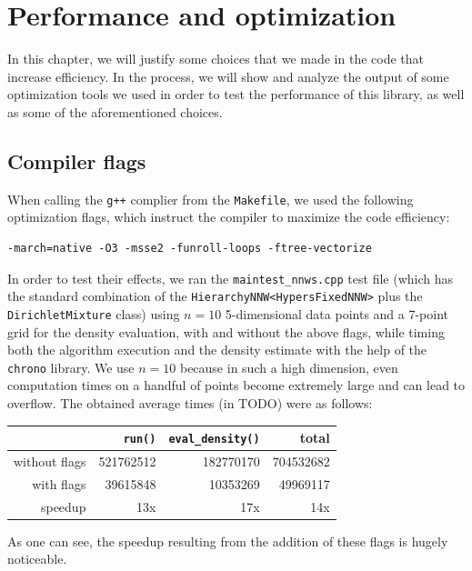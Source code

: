 \chapter{Performance and optimization}
In this chapter, we will justify some choices that we made in the code that increase efficiency.
In the process, we will show and analyze the output of some optimization tools we used in order to test the performance of this library, as well as some of the aforementioned choices.

\section{Compiler flags} \label{opt-flags}
When calling the \verb|g++| complier from the \verb|Makefile|, we used the following optimization flags, which instruct the compiler to maximize the code efficiency:
\begin{verbatim}
-march=native -O3 -msse2 -funroll-loops -ftree-vectorize
\end{verbatim}
In order to test their effects, we ran the \verb|maintest_nnws.cpp| test file (which has the standard combination of the \verb|HierarchyNNW<HypersFixedNNW>| plus the \verb|DirichletMixture| class) using $n=10$ 5-dimensional data points and a 7-point grid for the density evaluation, with and without the above flags, while timing both the algorithm execution and the density estimate with the help of the \verb|chrono| library.
We use $n=10$ because in such a high dimension, even computation times on a handful of points become extremely large and can lead to overflow.
The obtained average times (in TODO) were as follows:
\begin{center}
	\begin{tabular}{r|r|r|r}
	              	& \verb|run()| & \verb|eval_density()| & total \\ \hline
		without flags & 521762512 & 182770170 & 704532682 \\
		with flags    &  39615848 &  10353269 &  49969117 \\
		speedup       &       13x &       17x &       14x
	\end{tabular}
\end{center}
As one can see, the speedup resulting from the addition of these flags is hugely noticeable.


